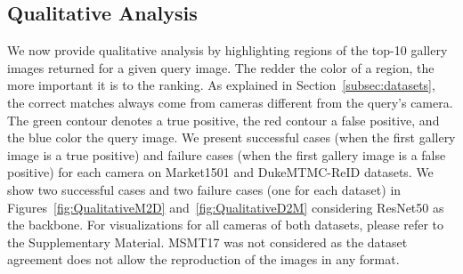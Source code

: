 \documentclass[journal]{IEEEtran}
\begin{document}
\subsection{Qualitative Analysis}

We now provide qualitative analysis by highlighting regions of the top-10 gallery images returned for a given query image. The redder the color of a region, the more important it is to the ranking. As explained in Section~\ref{subsec:datasets}, the correct matches always come from cameras different from the query’s camera. The green contour denotes a true positive, the red contour a false positive, and the blue color the query image. We present successful cases (when the first gallery image is a true positive) and failure cases (when the first gallery image is a false positive) for each camera on Market1501 and DukeMTMC-ReID datasets. We show two successful cases and two failure cases (one for each dataset) in Figures~\ref{fig:QualitativeM2D} and~\ref{fig:QualitativeD2M} considering ResNet50 as the backbone. For visualizations for all cameras of both datasets, please refer to the Supplementary Material. MSMT17 was not considered as the dataset agreement does not allow the reproduction of the images in any format.

\begin{figure*}[ht]
\centering
{}
\hfil
{}
\caption{The most activated regions in the gallery image given a query on DukeMTMCReID (Market  Duke scenario) for ResNet50. (a) Successful match; (b) Failure case.}
\label{fig:QualitativeM2D}
\end{figure*}

\begin{figure*}[ht]
\centering
{}
\caption{Highlighting image regions most activated on gallery image given query on Market1501 after run Duke  Market scenario on ResNet50. (a) Successful match; (b) Failure case.}
\label{fig:QualitativeD2M}
\end{figure*}
\end{document}
